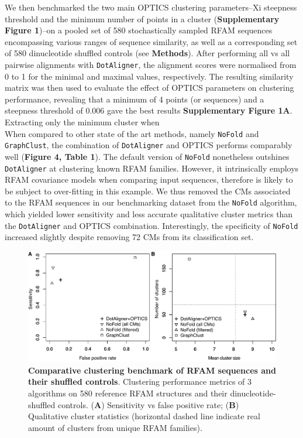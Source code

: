 \documentclass[a4paper,11pt]{article}
\newcommand\dotaligner{\texttt{DotAligner}}
\begin{document}
We then benchmarked the two main OPTICS clustering parameters--Xi steepness threshold 
and the minimum number of points in a cluster (\textbf{Supplementary Figure 1})--on a pooled set of 580 
stochastically sampled RFAM sequences encompassing various ranges of sequence similarity, 
as well as a corresponding set of 580 dinucleotide shuffled controls (see \textbf{Methods}). 
After performing all vs all pairwise alignments with \dotaligner{}, 
the alignment scores were normalised from 0 to 1 for the minimal and maximal values, respectively. 
The resulting similarity matrix was then used to evaluate the effect of OPTICS parameters on clustering performance, revealing that a minimum of 4 points (or sequences) and a steepness threshold of 0.006 
gave the best results \textbf{Supplementary Figure 1A}. 
Extracting only the minimum cluster when 
\\

When compared to other state of the art methods, namely \texttt{NoFold} and \texttt{GraphClust}, the combination of \dotaligner{} and OPTICS performs comparably well (\textbf{Figure 4, Table 1}). The default version of \texttt{NoFold} nonetheless outshines \dotaligner{} at clustering known RFAM families. However, 
it intrinsically employs RFAM covariance models when comparing input sequences, therefore is likely
to be subject to over-fitting in this example. We thus removed the CMs associated to the RFAM sequences
in our benchmarking dataset from the \texttt{NoFold} algorithm, which yielded lower sensitivity and less accurate qualitative cluster metrics than the \dotaligner{} and OPTICS combination. Interestingly, 
the specificity of  \texttt{NoFold}  increased slightly despite removing 72 CMs from its classification set. 

  \begin{figure}
 \includegraphics[width=\textwidth]{fig4}
 \caption { \textbf{Comparative clustering benchmark of RFAM sequences and their shuffled controls}. Clustering performance metrics of 3 algorithms on 580 reference RFAM 
 structures and their dinucleotide-shuffled controls. (\textbf{A}) Sensitivity vs false positive rate; (\textbf{B}) Qualitative cluster statistics (horizontal dashed line indicate real amount of clusters from unique RFAM families). }
\end{figure}
\end{document}

